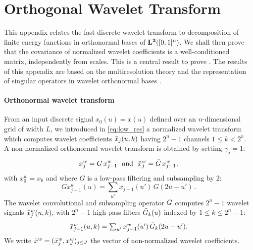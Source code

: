 \documentclass{article}
\begin{document}

\section{Orthogonal Wavelet Transform}
\label{sec:wavelet-transforms}

This appendix relates the fast discrete wavelet transform to decomposition of
finite energy functions in orthonormal bases of ${\bf L^2}([0,1]^n)$.  We shall then
prove that the covariance of normalized wavelet coefficients is a well-conditioned matrix, independently from scales. This is a central result to prove .  The results of this appendix are based on
the multiresolution theory \cite{mallat1999wavelet} and the representation of
singular operators in wavelet orthonormal bases \cite{Meyer:92c}.


\paragraph{Orthonormal wavelet transform}
From an input discrete signal $x_0 (u) = x(u)$ defined over an $n$-dimensional
grid of width $L$, we introduced in \eqref{eq:low_res}
a normalized wavelet transform which
computes wavelet coefficients ${\bar x}_j(u,k)$ having
$2^n -1$ channels $1 \leq k < 2^n$.
A non-normalized orthonormal wavelet transform is obtained 
by setting $\gamma_j = 1$:
\begin{equation}
  \label{fastdec3}
x^w_j = G\, x^w_{j-1} ~~\mbox{and}~~
{\bar x}^w_j = {\bar {G}}\, x^w_{j-1} ,
\end{equation}
with $x^w_0 = x_0$ and where $G$ is a low-pass filtering and subsampling by $2$:
\begin{equation}
  \label{low-pass20}
  \textstyle{
    G x^w_{j-1} (u) =  \sum_{u'} x_{j-1} (u')\, G (2u-u')\,.
    }
\end{equation}
The wavelet convolutional and subsampling operator
${\bar {G}}$ computes $2^n-1$ wavelet signals ${\bar x}^w_j (u,k)$, 
with  $2^n-1$ high-pass filters ${\bar {G}}_k(u)$ indexed by $1 \leq k \leq 2^n-1$: 
\[
  \textstyle{
    {\bar x}^w_{j-1} (u,k) =  \sum_{u'} x^w_{j-1} (u')\, {\bar {G}}_k (2u-u').
    }
\]
We write ${\bar x}^w = ({\bar x}^w_j , x^w_J)_{j \leq J}$ the vector of non-normalized wavelet coefficients.
\end{document}
